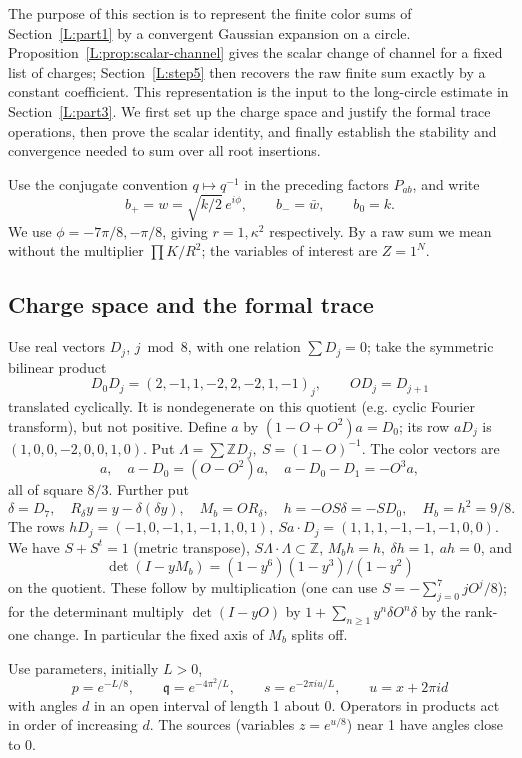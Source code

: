 \documentclass[11pt]{article}
\numberwithin{equation}{section}
\theoremstyle{definition}\newtheorem{definition}[theorem]{Definition}
\theoremstyle{remark}\newtheorem{remark}[theorem]{Remark}
\begin{document}
The purpose of this section is to represent the finite color sums of
Section~\ref{L:part1} by a convergent Gaussian expansion on a circle.
Proposition~\ref{L:prop:scalar-channel} gives the scalar change of channel
for a fixed list of charges; Section~\ref{L:step5} then recovers the raw
finite sum exactly by a constant coefficient. This representation is the
input to the long-circle estimate in Section~\ref{L:part3}. We first set up
the charge space and justify the formal trace operations, then prove the
scalar identity, and finally establish the stability and convergence
needed to sum over all root insertions.

Use the conjugate convention \(q\mapsto q^{-1}\) in the preceding factors \(P_{ab}\), and write
\[
 b_+=w=\sqrt{k/2}\,e^{i\phi},\qquad b_-=\bar w,\qquad b_0=k .
\]
We use \(\phi=-7\pi/8,-\pi/8\), giving \(r=1,\kappa^2\) respectively. By a raw sum we mean without the multiplier \(\prod K/R^2\); the variables of interest are \(Z=1^N\).

\subsection{Charge space and the formal trace}

Use real vectors \(D_j\), \(j\bmod8\), with one relation \(\sum D_j=0\); take the symmetric bilinear product
\[
 D_0 D_j=(2,-1,1,-2,2,-2,1,-1)_j,\qquad O D_j=D_{j+1}
\]
translated cyclically. It is nondegenerate on this quotient (e.g. cyclic Fourier transform), but not positive. Define \(a\) by \((1-O+O^2)a=D_0\); its row \(aD_j\) is \((1,0,0,-2,0,0,1,0)\). Put \(\Lambda=\sum\mathbb Z D_j,\ S=(1-O)^{-1}\). The color vectors are
\[
 a,\quad a-D_0=(O-O^2)a,\quad a-D_0-D_1=-O^3a ,
\]
all of square \(8/3\). Further put
\[
 \delta=D_7,\quad R_\delta y=y-\delta(\delta y),\quad M_b=O R_\delta,\quad h=-OS\delta=-S D_0,\quad H_b=h^2=9/8 .
\]
The rows \(hD_j=(-1,0,-1,1,-1,1,0,1),\ Sa\cdot D_j=(1,1,1,-1,-1,-1,0,0)\). We have \(S+S^t=1\) (metric transpose), \(S\Lambda\cdot\Lambda\subset\mathbb Z\), \(M_b h=h,\ \delta h=1,\ ah=0\), and
\[
 \det(I-yM_b)=(1-y^6)(1-y^3)/(1-y^2)
\]
on the quotient. These follow by multiplication (one can use \(S=-\sum_{j=0}^7 j O^j/8\)); for the determinant multiply \(\det(I-yO)\) by \(1+\sum_{n\ge1}y^n\delta O^n\delta\) by the rank-one change. In particular the fixed axis of \(M_b\) splits off.

Use parameters, initially \(L>0\),
\[
 p=e^{-L/8},\qquad \mathfrak q=e^{-4\pi^2/L},\qquad s=e^{-2\pi i u/L},\qquad u=x+2\pi i d
\]
with angles \(d\) in an open interval of length 1 about 0. Operators in products act in order of increasing \(d\). The sources (variables \(z=e^{u/8}\)) near 1 have angles close to 0.
\end{document}
